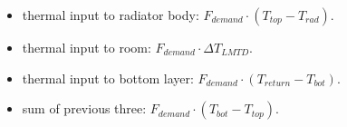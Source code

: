 \begin{itemize}
	\item thermal input to radiator body: $F_{demand} \cdot (T_{top} - T_{rad})$.
	\item thermal input to room: $ F_{demand} \cdot \Delta T_{LMTD}$.
	\item thermal input to bottom layer: $F_{demand} \cdot (T_{return} - T_{bot})$.
	\item sum of previous three: $F_{demand} \cdot (T_{bot} - T_{top})$.
\end{itemize}
